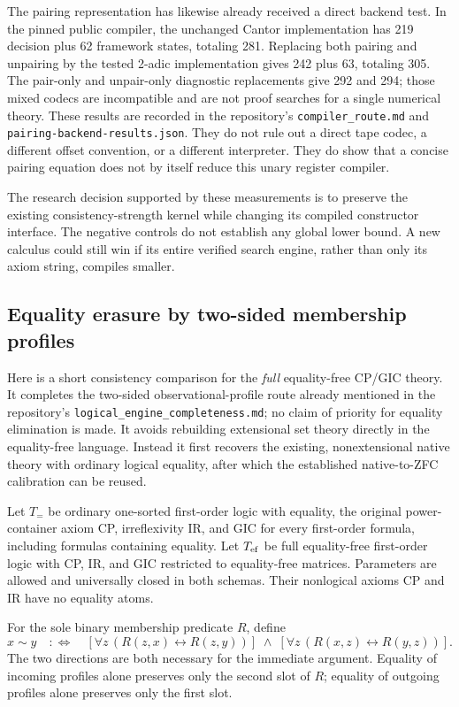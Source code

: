 The pairing representation has likewise already received a direct backend
test.  In the pinned public compiler, the unchanged Cantor implementation
has 219 decision plus 62 framework states, totaling 281.  Replacing both
pairing and unpairing by the tested 2-adic implementation gives 242 plus
63, totaling 305.  The pair-only and unpair-only diagnostic replacements
give 292 and 294; those mixed codecs are incompatible and are not proof
searches for a single numerical theory.  These results are recorded in the
repository's \texttt{compiler\_route.md} and
\texttt{pairing-backend-results.json}.  They do not rule out a direct tape
codec, a different offset convention, or a different interpreter.  They do
show that a concise pairing equation does not by itself reduce this unary
register compiler.

The research decision supported by these measurements is to preserve the
existing consistency-strength kernel while changing its compiled
constructor interface.  The negative controls do not establish any global
lower bound.  A new calculus could still win if its entire verified search
engine, rather than only its axiom string, compiles smaller.

\subsection{Equality erasure by two-sided membership profiles}
\label{sec:equality-erasure}

Here is a short consistency comparison for the \emph{full} equality-free
CP/GIC theory.  It completes the two-sided observational-profile route
already mentioned in the repository's \texttt{logical\_engine\_completeness.md};
no claim of priority for equality elimination is made.  It avoids rebuilding
extensional set theory directly in the equality-free language.  Instead it
first recovers the existing, nonextensional native theory with ordinary
logical equality, after which the established native-to-ZFC calibration
can be reused.

Let $T_{=}$ be ordinary one-sorted first-order logic with equality, the
original power-container axiom CP, irreflexivity IR, and GIC for every
first-order formula, including formulas containing equality.  Let $T_{\rm ef}$
be full equality-free first-order logic with CP, IR, and GIC restricted to
equality-free matrices.  Parameters are allowed and universally closed in
both schemas.  Their nonlogical axioms CP and IR have no equality atoms.

For the sole binary membership predicate $R$, define
\[
 x\sim y\quad:\!\!\Longleftrightarrow\quad
 [\forall z\,(R(z,x)\leftrightarrow R(z,y))]
 \;\land\;
 [\forall z\,(R(x,z)\leftrightarrow R(y,z))].
\]
The two directions are both necessary for the immediate argument.  Equality
of incoming profiles alone preserves only the second slot of $R$; equality
of outgoing profiles alone preserves only the first slot.

